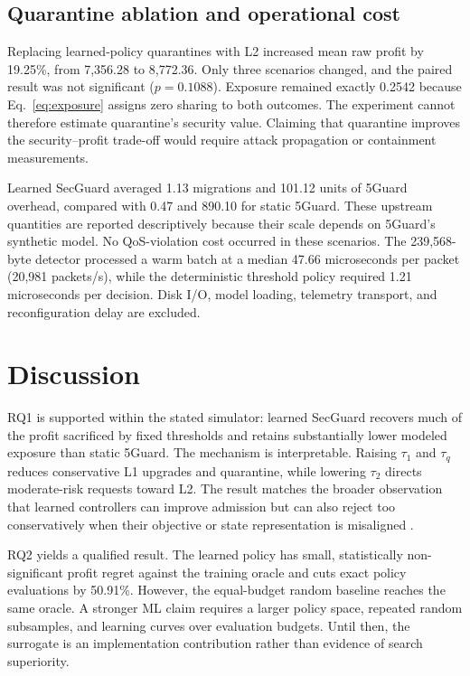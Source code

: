 \documentclass[conference]{IEEEtran}
\begin{document}
\subsection{Quarantine ablation and operational cost}
\label{sec:ablation}
Replacing learned-policy quarantines with L2 increased mean raw profit by
19.25\%, from 7,356.28 to 8,772.36. Only three scenarios changed, and the paired
result was not significant ($p=0.1088$). Exposure remained exactly 0.2542
because Eq.~\eqref{eq:exposure} assigns zero sharing to both outcomes. The
experiment cannot therefore estimate quarantine's security value. Claiming that
quarantine improves the security--profit trade-off would require attack
propagation or containment measurements.

Learned SecGuard averaged 1.13 migrations and 101.12 units of 5Guard overhead,
compared with 0.47 and 890.10 for static 5Guard. These upstream quantities are
reported descriptively because their scale depends on 5Guard's synthetic model.
No QoS-violation cost occurred in these scenarios. The 239,568-byte detector
processed a warm batch at a median 47.66 microseconds per packet (20,981
packets/s), while the deterministic threshold policy required 1.21 microseconds
per decision. Disk I/O, model loading, telemetry transport, and reconfiguration
delay are excluded.

\section{Discussion}
RQ1 is supported within the stated simulator: learned SecGuard recovers much of
the profit sacrificed by fixed thresholds and retains substantially lower
modeled exposure than static 5Guard. The mechanism is interpretable. Raising
$\tau_1$ and $\tau_q$ reduces conservative L1 upgrades and quarantine, while
lowering $\tau_2$ directs moderate-risk requests toward L2. The result matches
the broader observation that learned controllers can improve admission but can
also reject too conservatively when their objective or state representation is
misaligned \cite{troia2022admission,asdikian2025verifying}.

RQ2 yields a qualified result. The learned policy has small, statistically
non-significant profit regret against the training oracle and cuts exact policy
evaluations by 50.91\%. However, the equal-budget random baseline reaches the
same oracle. A stronger ML claim requires a larger policy space, repeated random
subsamples, and learning curves over evaluation budgets. Until then, the
surrogate is an implementation contribution rather than evidence of search
superiority.
\end{document}
